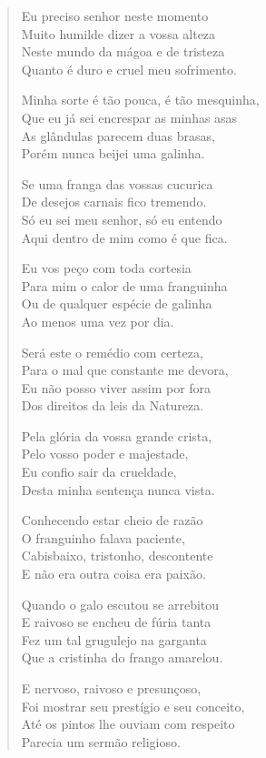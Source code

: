 \begin{verse}
Eu preciso senhor neste momento\\
Muito humilde dizer a vossa alteza\\
Neste mundo da mágoa e de tristeza\\
Quanto é duro e cruel meu sofrimento.

Minha sorte é tão pouca, é tão mesquinha,\\
Que eu já sei encrespar as minhas asas\\
As glândulas parecem duas brasas,\\
Porém nunca beijei uma galinha.

Se uma franga das vossas cucurica\\
De desejos carnais fico tremendo.\\
Só eu sei meu senhor, só eu entendo\\
Aqui dentro de mim como é que fica.

Eu vos peço com toda cortesia\\
Para mim o calor de uma franguinha\\
Ou de qualquer espécie de galinha\\
Ao menos uma vez por dia.

Será este o remédio com certeza,\\
Para o mal que constante me devora,\\
Eu não posso viver assim por fora\\
Dos direitos da leis da Natureza.

Pela glória da vossa grande crista,\\
Pelo vosso poder e majestade,\\
Eu confio sair da crueldade,\\
Desta minha sentença nunca vista.

Conhecendo estar cheio de razão\\
O franguinho falava paciente,\\
Cabisbaixo, tristonho, descontente\\
E não era outra coisa era paixão.

Quando o galo escutou se arrebitou\\
E raivoso se encheu de fúria tanta\\
Fez um tal grugulejo na garganta\\
Que a cristinha do frango amarelou.

E nervoso, raivoso e presunçoso,\\
Foi mostrar seu prestígio e seu conceito,\\
Até os pintos lhe ouviam com respeito\\
Parecia um sermão religioso.


\end{verse}
